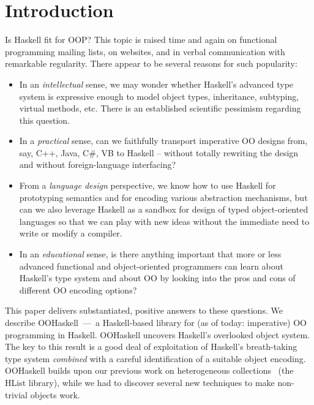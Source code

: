 \section{Introduction}

Is Haskell fit for OOP? This topic is raised time and again on
functional programming mailing lists, on websites, and in verbal
communication with remarkable regularity. There appear to be several
reasons for such popularity:

\smallskip

\begin{itemize}

\item In an \emph{intellectual} sense, we may wonder whether Haskell's
advanced type system is expressive enough to model object types,
inheritance, subtyping, virtual methods, etc. There is an established
scientific pessimism regarding this question.

\smallskip

\item In a \emph{practical} sense, can we faithfully transport
imperative OO designs from, say, C++, Java, C\#, VB to Haskell --
without totally rewriting the design and without foreign-language
interfacing?

\smallskip

\item From a \emph{language design} perspective, we know how to use
Haskell for prototyping semantics and for encoding various abstraction
mechanisms, but can we also leverage Haskell as a sandbox for design
of typed object-oriented languages so that we can play with new ideas
without the immediate need to write or modify a compiler.

\smallskip

\item In an \emph{educational} sense, is there anything important that
more or less advanced functional and object-oriented programmers can
learn about Haskell's type system and about OO by looking into the
pros and cons of different OO encoding options?

\end{itemize}

\smallskip

This paper delivers substantiated, positive answers to these
questions. We describe OOHaskell~---~a Haskell-based library for (as
of today: imperative) OO programming in Haskell. OOHaskell uncovers
Haskell's overlooked object system. The key to this result is a good
deal of exploitation of Haskell's breath-taking type system
\emph{combined} with a careful identification of a suitable object
encoding. OOHaskell builds upon our previous work on heterogeneous
collections~\cite{HLIST-HW04} (the HList library), while we had to
discover several new techniques to make non-trivial objects work.


